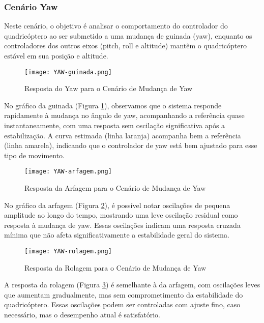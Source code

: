 \subsubsection{Cenário Yaw}

Neste cenário, o objetivo é analisar o comportamento do controlador do quadricóptero ao ser submetido a uma mudança de guinada (yaw), enquanto os controladores dos outros eixos (pitch, roll e altitude) mantêm o quadricóptero estável em sua posição e altitude.

\begin{figure}[H]
    \centering
    \texttt{[image: YAW-guinada.png]}
    \caption{Resposta do Yaw para o Cenário de Mudança de Yaw}
    \label{fig:YAW-guinada}
\end{figure}

No gráfico da guinada (Figura \ref{fig:YAW-guinada}), observamos que o sistema responde rapidamente à mudança no ângulo de yaw, acompanhando a referência quase instantaneamente, com uma resposta sem oscilação significativa após a estabilização. A curva estimada (linha laranja) acompanha bem a referência (linha amarela), indicando que o controlador de yaw está bem ajustado para esse tipo de movimento.

\begin{figure}[H]
    \centering
    \texttt{[image: YAW-arfagem.png]}
    \caption{Resposta da Arfagem para o Cenário de Mudança de Yaw}
    \label{fig:YAW-arfagem}
\end{figure}

No gráfico da arfagem (Figura \ref{fig:YAW-arfagem}), é possível notar oscilações de pequena amplitude ao longo do tempo, mostrando uma leve oscilação residual como resposta à mudança de yaw. Essas oscilações indicam uma resposta cruzada mínima que não afeta significativamente a estabilidade geral do sistema.

\begin{figure}[H]
    \centering
    \texttt{[image: YAW-rolagem.png]}
    \caption{Resposta da Rolagem para o Cenário de Mudança de Yaw}
    \label{fig:YAW-rolagem}
\end{figure}

A resposta da rolagem (Figura \ref{fig:YAW-rolagem}) é semelhante à da arfagem, com oscilações leves que aumentam gradualmente, mas sem comprometimento da estabilidade do quadricóptero. Essas oscilações podem ser controladas com ajuste fino, caso necessário, mas o desempenho atual é satisfatório.

